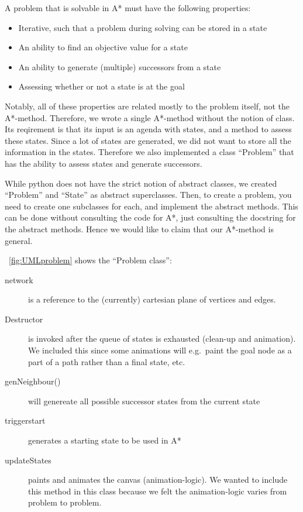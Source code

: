 \documentclass[journal]{IEEEtran}
\begin{document}
A problem that is solvable in A* must have the following properties:
\begin{itemize}
    \item Iterative, such that a problem during solving can be stored in a state
    \item An ability to find an objective value for a state
    \item An ability to generate (multiple) successors from a state
    \item Assessing whether or not a state is at the goal
\end{itemize}
Notably, all of these properties are related mostly to the problem itself, not
the A*-method. Therefore, we wrote a single A*-method without the notion of class.
Its reqirement is that its input is an agenda with states, and a method
to assess these states. Since a lot of states are generated, we did not want
to store all the information in the states. Therefore we also implemented
a class ``Problem'' that has the ability to assess states and generate successors.

While python does not have the strict notion of abstract classes, we created
``Problem'' and ``State'' as abstract superclasses. Then,
to create a problem, you need to create one subclasses for each, and implement
the abstract methods. This can be done without consulting the code for A*,
just consulting the docstring for the abstract methods. Hence we would like
to claim that our A*-method is general.

~\autoref{fig:UMLproblem} shows the ``Problem class'':
\begin{description}
    \item[network] is a reference to the (currently) cartesian
    plane of vertices and edges. 
    \item[Destructor] is invoked after the queue of states is exhausted (clean-up and animation).
        We included this since some animations will e.g.\ paint the goal node as
        a part of a path rather than a final state, etc.
    \item[genNeighbour()] will genereate all possible successor states
        from the current state
    \item[triggerstart] generates a starting state to be used in A*
    \item[updateStates] paints and animates the canvas (animation-logic). 
        We wanted to include this method in this class because we felt the
        animation-logic varies from problem to problem.
\end{description}
\end{document}
